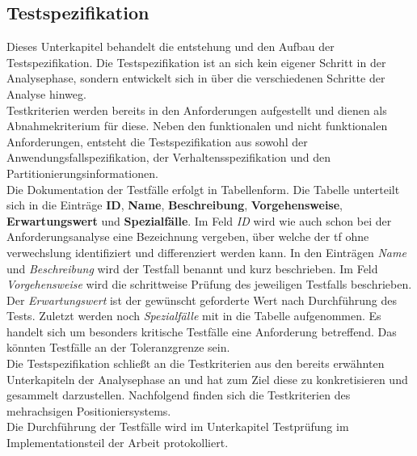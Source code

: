 \documentclass[../../../Bachelorarbeit.tex]{subfiles}
\begin{document}
\subsection{Testspezifikation}
Dieses Unterkapitel behandelt die entstehung und den Aufbau der Testspezifikation. Die Testspezifikation ist an sich kein eigener Schritt in der Analysephase, sondern entwickelt sich in über die verschiedenen Schritte der Analyse hinweg.\\
Testkriterien werden bereits in den Anforderungen aufgestellt und dienen als Abnahmekriterium für diese. Neben den funktionalen und nicht funktionalen Anforderungen, entsteht die Testspezifikation aus sowohl der Anwendungsfallspezifikation, der Verhaltensspezifikation und den Partitionierungsinformationen.\\
Die Dokumentation der Testfälle erfolgt in Tabellenform. Die Tabelle unterteilt sich in die Einträge \textbf{ID}, \textbf{Name}, \textbf{Beschreibung}, \textbf{Vorgehensweise}, \textbf{Erwartungswert} und \textbf{Spezialfälle}. Im Feld \textit{ID} wird wie auch schon bei der Anforderungsanalyse eine Bezeichnung vergeben, über welche der \ac{tf} ohne verwechslung identifiziert und differenziert werden kann. In den Einträgen \textit{Name} und \textit{Beschreibung} wird der Testfall benannt und kurz beschrieben. Im Feld \textit{Vorgehensweise} wird die schrittweise Prüfung des jeweiligen Testfalls beschrieben. Der \textit{Erwartungswert} ist der gewünscht \bzw geforderte Wert nach Durchführung des Tests. Zuletzt werden noch \textit{Spezialfälle} mit in die Tabelle aufgenommen. Es handelt sich um besonders kritische Testfälle eine Anforderung betreffend. Das könnten \zB Testfälle an der Toleranzgrenze sein.\\
Die Testspezifikation schließt an die Testkriterien aus den bereits erwähnten Unterkapiteln der Analysephase an und hat zum Ziel diese zu konkretisieren und gesammelt darzustellen. Nachfolgend finden sich die Testkriterien des mehrachsigen Positioniersystems.\\ %
Die Durchführung der Testfälle wird im Unterkapitel Testprüfung im Implementationsteil der Arbeit protokolliert. %
\end{document}
